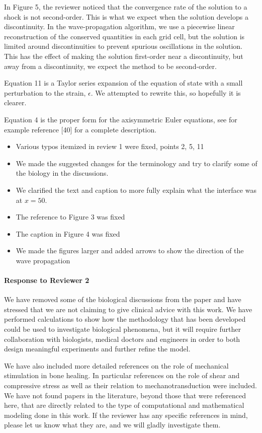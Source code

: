 \documentclass{report}
\begin{document}
In Figure 5, the reviewer noticed that the convergence rate of the solution to a shock is not second-order.  This is what we expect when the solution develops a discontinuity.  In the wave-propagation algorithm, we use a piecewise linear reconstruction of the conserved quantities in each grid cell, but the solution is limited around discontinuities to prevent spurious oscillations in the solution.  This has the effect of making the solution first-order near a discontinuity, but away from a discontinuity, we expect the method to be second-order. 

Equation 11 is a Taylor series expansion of the equation of state with a
small perturbation to the strain, $\epsilon$.  We attempted to rewrite this, so hopefully it is clearer.

Equation 4 is the proper form for the axisymmetric Euler equations, see for example reference [40] for a complete description.  

\begin{itemize}
\item Various typos itemized in review 1 were fixed, points 2, 5, 11
\item We made the suggested changes for the terminology and try to clarify some of the biology in the discussions.
\item We clarified the text and caption to more fully explain what the interface was at $x = 50$.
\item The reference to Figure 3 was fixed
\item The caption in Figure 4 was fixed
\item We made the figures larger and added arrows to show the direction of the wave propagation 
\end{itemize}

\paragraph{Response to Reviewer 2}
We have removed some of the biological discussions from the paper and have stressed that we are not claiming to give clinical advice with this work.  We have performed calculations to show how the methodology that has been developed could be used to investigate biological phenomena, but it will require further collaboration with biologists, medical doctors and engineers in order to both design meaningful experiments and further refine the model. 

We have also included more detailed references on the role of mechanical stimulation in bone healing.  In particular references on the role of shear and compressive stress as well as their relation to mechanotransduction were included.  We have not found papers in the literature, beyond those that were referenced here, that are directly related to the type of computational and mathematical modeling done in this work.  If the reviewer has any specific references in mind, please let us know what they are, and we will gladly investigate them.  
\end{document}
